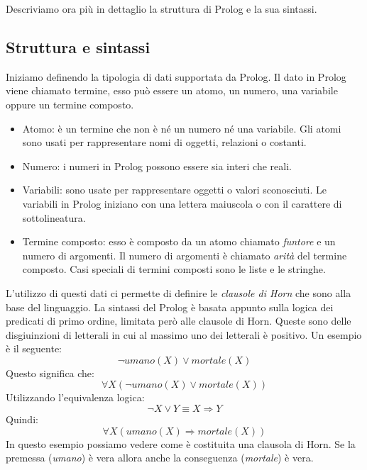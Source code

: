Descriviamo ora più in dettaglio la struttura di Prolog e la sua sintassi.



\subsection{Struttura e sintassi}
\label{subsec:sintassi}
Iniziamo definendo la tipologia di dati supportata da Prolog.
Il dato in Prolog viene chiamato termine, esso può essere un atomo, un numero, una variabile oppure un termine composto.
\begin{itemize}
    \item Atomo: è un termine che non è né un numero né una variabile. Gli atomi sono usati per rappresentare nomi di oggetti, relazioni o costanti.
    \item Numero: i numeri in Prolog possono essere sia interi che reali.
    \item Variabili: sono usate per rappresentare oggetti o valori sconosciuti. Le variabili in Prolog iniziano con una lettera maiuscola o con il carattere di sottolineatura.
    \item Termine composto: esso è composto da un atomo chiamato \textit{funtore} e un numero di argomenti. Il numero di argomenti è chiamato \textit{arità} del termine composto.
          Casi speciali di termini composti sono le liste  e le stringhe.
\end{itemize} 
L'utilizzo di questi dati ci permette di definire le \textit{clausole di Horn} \cite{horn1951sentences} che sono alla base del linguaggio.
La sintassi del Prolog è basata appunto sulla logica dei predicati di primo ordine, limitata però alle clausole di Horn.
Queste sono delle disgiuinzioni di letterali in cui al massimo uno dei letterali è positivo. Un esempio è il seguente:
\begin{equation}
    \label{eq:clausolaHorn1}
    \neg umano(X) \lor mortale(X)
\end{equation}
Questo significa che:
\begin{equation}
    \label{eq:clausolaHorn2}
    \forall X ( \neg umano(X) \lor mortale(X) )
\end{equation}
Utilizzando l'equivalenza logica:
\begin{equation}
    \label{eq:clausolaHorn3}
    \neg X \lor Y \equiv X \Rightarrow Y
\end{equation}
Quindi:
\begin{equation}
    \label{eq:clausolaHorn4}
    \forall X ( umano(X) \Rightarrow mortale(X))
\end{equation}
In questo esempio possiamo vedere come è costituita una clausola di Horn. Se la premessa (\textit{umano}) è vera allora
anche la conseguenza (\textit{mortale}) è vera.

